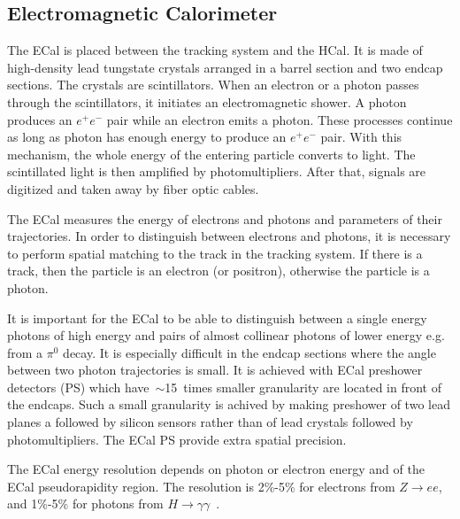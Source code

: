 \subsection{Electromagnetic Calorimeter}

The ECal is placed between the tracking system and the HCal. It is made of high-density lead tungstate crystals arranged in a barrel section and two endcap sections. The crystals are scintillators. When an electron or a photon passes through the scintillators, it initiates an electromagnetic shower. A photon produces an $e^+ e^-$ pair while an electron emits a photon. These processes continue as long as photon has enough energy to produce an $e^+ e^-$ pair. With this mechanism, the whole energy of the entering particle converts to light. The scintillated light is then amplified by photomultipliers. After that, signals are digitized and taken away by fiber optic cables.

The ECal measures the energy of electrons and photons and parameters of their trajectories. In order to distinguish between electrons and photons, it is necessary to perform spatial matching to the track in the tracking system. If there is a track, then the particle is an electron (or positron), otherwise the particle is a photon.

It is important for the ECal to be able to distinguish between a single energy photons of high energy and pairs of almost collinear photons of lower energy e.g. from a $\pi^0$ decay. It is especially difficult in the endcap sections where the angle between two photon trajectories is small. It is achieved with ECal preshower detectors (PS) which have~$\sim$15~times smaller granularity are located in front of the endcaps. Such a small granularity is achived by making preshower of two lead planes a followed by silicon sensors rather than of lead crystals followed by photomultipliers. The ECal PS provide extra spatial precision. 

The ECal energy resolution depends on photon or electron energy and of the ECal pseudorapidity region. The resolution is 2\%-5\% for electrons from $Z\rightarrow ee$, and 1\%-5\% for photons from $H\rightarrow\gamma\gamma$~\cite{ref_ECalResolution}.



